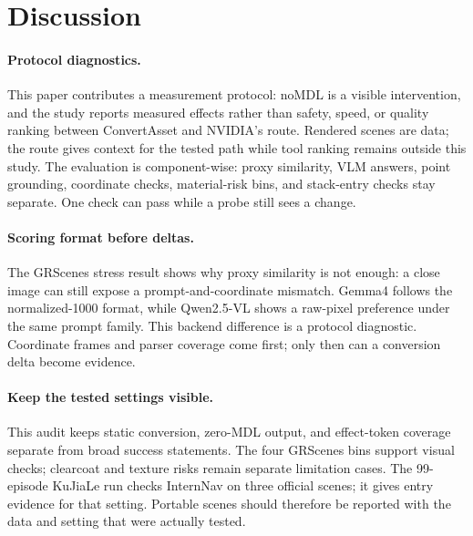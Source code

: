 \section{Discussion}
\label{sec:discussion}

\paragraph{Protocol diagnostics.}
This paper contributes a measurement protocol: noMDL is a visible intervention,
and the study reports measured effects rather than safety, speed, or quality
ranking between ConvertAsset and NVIDIA's route. Rendered scenes are data; the
route gives context for the tested path while tool ranking remains outside this study. The
evaluation is component-wise: proxy similarity, VLM answers, point grounding,
coordinate checks, material-risk bins, and stack-entry checks stay separate. One
check can pass while a probe still sees a change.

\paragraph{Scoring format before deltas.}
The GRScenes stress result shows why proxy similarity is not enough: a close
image can still expose a prompt-and-coordinate mismatch. Gemma4
follows the normalized-1000 format, while \mbox{Qwen2.5-VL} shows a raw-pixel
preference under the same prompt family. This backend difference is a protocol
diagnostic.
Coordinate frames and parser coverage come first; only then can a conversion
delta become evidence.

\paragraph{Keep the tested settings visible.}
This audit keeps static conversion, zero-MDL output, and effect-token
coverage separate from broad success statements. The four GRScenes bins support
visual checks; clearcoat and texture risks remain separate limitation cases. The
99-episode KuJiaLe run
checks InternNav on three official scenes; it gives entry evidence for that
setting. Portable scenes should therefore be reported with the data
and setting that were actually tested.
